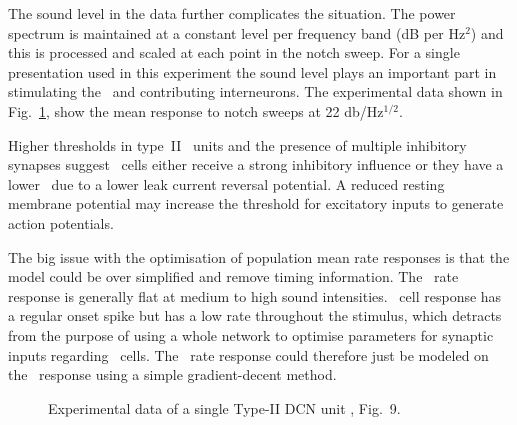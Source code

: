 \smallskip{}

The sound level in the \citet{ReissYoung:2005} data further complicates the
situation.  The power spectrum is maintained at a constant level per frequency
band (dB per Hz$^2$) and this is processed and scaled at each point in the notch
sweep.  For a single presentation used in this experiment the sound level plays
an important part in stimulating the \ANFs~and contributing interneurons.  The
experimental data shown in Fig.~\ref{fig:TVReissFig9}, show the mean response to
notch sweeps at 22 db/Hz$^{1/2}$.

\smallskip{}

Higher thresholds in type~II \DCN~units \citep{SpirouDavisEtAl:1999} and the
presence of multiple inhibitory synapses \citep{Alibardi:2006} suggest \TV~cells
either receive a strong inhibitory influence or they have a lower \RMP~due to a
lower leak current reversal potential. A reduced resting membrane potential may
increase the threshold for excitatory inputs to generate action potentials.


\smallskip{}

The big issue with the optimisation of population mean rate responses is that
the model could be over simplified and remove timing information.  The \HSR~rate
response is generally flat at medium to high sound intensities. \DS~cell
response has a regular onset spike but has a low rate throughout the stimulus,
which detracts from the purpose of using a whole network to optimise parameters
for synaptic inputs regarding \TV~cells.  The \TV~rate response could therefore
just be modeled on the \LSR~response using a simple gradient-decent
method. 
 
\smallskip{}


\begin{figure}[htb]
  \centering {}
  \caption{Experimental data of a single Type-II DCN unit
    \citep{ReissYoung:2005}, Fig.~9.}
  \label{fig:TVReissFig9}
\end{figure}


